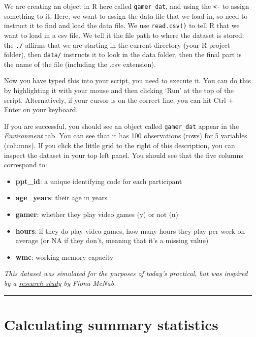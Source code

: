 \documentclass[
  a4paper,
  DIV=11,
  numbers=noendperiod]{scrreprt}
\providecommand{\tightlist}{%
  \setlength{\itemsep}{0pt}\setlength{\parskip}{0pt}}
\begin{document}
We are creating an object in R here called \texttt{gamer\_dat}, and
using the \texttt{\textless{}-} to assign something to it. Here, we want
to assign the data file that we load in, so need to instruct it to find
and load the data file. We use \texttt{read.csv()} to tell R that we
want to load in a csv file. We tell it the file path to where the
dataset is stored: the \texttt{./} affirms that we are starting in the
current directory (your R project folder), then \texttt{data/} instructs
it to look in the data folder, then the final part is the name of the
file (including the .csv extension).

Now you have typed this into your script, you need to execute it. You
can do this by highlighting it with your mouse and then clicking `Run'
at the top of the script. Alternatively, if your cursor is on the
correct line, you can hit Ctrl + Enter on your keyboard.

If you are successful, you should see an object called
\texttt{gamer\_dat} appear in the \emph{Environment} tab. You can see
that it has 100 observations (rows) for 5 variables (columns). If you
click the little grid to the right of this description, you can inspect
the dataset in your top left panel. You should see that the five columns
correspond to:

\begin{itemize}
\tightlist
\item
  \textbf{ppt\_id}: a unique identifying code for each participant
\item
  \textbf{age\_years}: their age in years
\item
  \textbf{gamer}: whether they play video games (y) or not (n)
\item
  \textbf{hours}: if they do play video games, how many hours they play
  per week on average (or NA if they don't, meaning that it's a missing
  value)
\item
  \textbf{wmc}: working memory capacity
\end{itemize}

\emph{This dataset was simulated for the purposes of today's practical,
but was inspired by a
\href{https://doi.org/10.1016/j.heliyon.2023.e19098}{research study} by
Fiona McNab.}

\begin{center}\rule{0.5\linewidth}{0.5pt}\end{center}

\chapter{Calculating summary
statistics}\label{calculating-summary-statistics}
\end{document}
